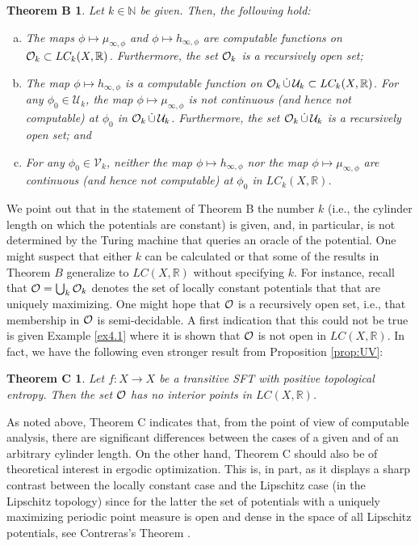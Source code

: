 \documentclass[11pt, reqno]{amsart}
\newcommand{\bR}{{\mathbb R}}
\newcommand{\bN}{{\mathbb N}}
\newcommand{\cU}{{\mathcal U}}
\newcommand{\cV}{{\mathcal V}}
\newtheorem*{thmB}{Theorem B}
\newtheorem*{thmC}{Theorem C}
\begin{document}
\begin{thmB}
Let $k\in \bN$ be given.  Then, the following hold:
\begin{enumerate}[(a)]
\item
The maps $\phi\mapsto\mu_{\infty,\phi}$ and $\phi\mapsto h_{\infty,\phi}$ are computable functions on $\cO_k\subset LC_k(X,\bR)$.  Furthermore, the set $\mathcal O_k$ is a recursively open set;
 \item
The map $\phi\mapsto h_{\infty,\phi}$ is a computable function on $\cO_k\,\dot\cup\,\cU_k\subset LC_k(X,\bR)$.  For any $\phi_0\in\cU_k$, the map $\phi\mapsto \mu_{\infty,\phi}$ is not continuous (and hence not computable) at $\phi_0$ in $\cO_k\,\dot\cup\,\cU_k$.  Furthermore, the set $\cO_k\,\dot\cup\,\cU_k$ is a recursively open set; and
\item
For any $\phi_0\in\cV_k$, neither the map $\phi\mapsto h_{\infty,\phi}$ nor the map $\phi\mapsto \mu_{\infty,\phi}$ are continuous (and hence not computable) at $\phi_0$ in $LC_k(X,\bR)$.
\end{enumerate}
\end{thmB}

We point out that in the statement of Theorem B the number $k$ (i.e., the cylinder length on which the potentials are constant) is given, and, in particular, is not determined by the Turing machine that queries an oracle of the potential.  One might suspect that either $k$ can be calculated or that some of the results in Theorem $B$ generalize to $LC(X,\bR)$ without specifying $k$.  For instance, recall that $\mathcal O=\bigcup_k \mathcal O_k$ denotes the set of locally constant potentials that that are uniquely maximizing.  One might hope that $\mathcal O$ is a recursively open set, i.e., that membership in $\mathcal O$ is semi-decidable.  A first indication that this could not be true is given
Example \ref{ex4.1}  where it is shown that $\mathcal O$ is not open in $LC(X,\bR)$. In fact, we have the following even stronger result from Proposition \ref{prop:UV}:
\begin{thmC}
 Let $f:X\to X$ be a transitive SFT with positive topological entropy. Then the set $\mathcal O$ has no interior points in $LC(X,\bR)$.
 \end{thmC}
 As noted above, Theorem C indicates that, from the point of view of computable analysis, there are significant differences between the cases of a given and of an arbitrary cylinder length. On the other hand, Theorem C should also be of theoretical interest in ergodic optimization. This is, in part, as it displays a sharp contrast between the locally constant case and the  Lipschitz case (in the Lipschitz topology) since for the latter the set of  potentials with a uniquely maximizing periodic point measure is open and dense
 in the space of all Lipschitz potentials, see Contreras's Theorem \cite{C}.
 
\end{document}
